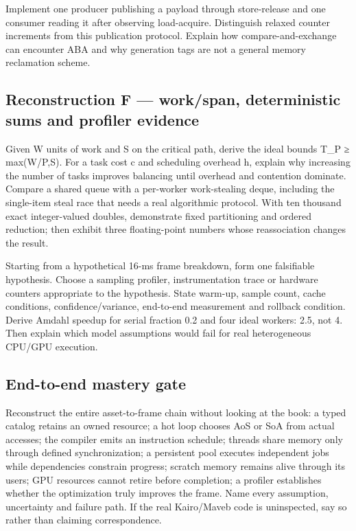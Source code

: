 Implement one producer publishing a payload through store-release and one consumer reading it after observing load-acquire. Distinguish relaxed counter increments from this publication protocol. Explain how compare-and-exchange can encounter ABA and why generation tags are not a general memory reclamation scheme.

\subsection{Reconstruction F --- work/span, deterministic sums and profiler evidence}\label{appendix-2587680a4fe3-reconstruction-f-workspan-deterministic-sums-and-profiler-evidence}

\hypertarget{appendix-2587680a4fe3-reconstruction-f-workspan-deterministic-sums-and-profiler-evidence}{}

Given W units of work and S on the critical path, derive the ideal bounds T\_P ≥ max(W/P,S). For a task cost c and scheduling overhead h, explain why increasing the number of tasks improves balancing until overhead and contention dominate. Compare a shared queue with a per-worker work-stealing deque, including the single-item steal race that needs a real algorithmic protocol. With ten thousand exact integer-valued doubles, demonstrate fixed partitioning and ordered reduction; then exhibit three floating-point numbers whose reassociation changes the result.

Starting from a hypothetical 16-ms frame breakdown, form one falsifiable hypothesis. Choose a sampling profiler, instrumentation trace or hardware counters appropriate to the hypothesis. State warm-up, sample count, cache conditions, confidence/variance, end-to-end measurement and rollback condition. Derive Amdahl speedup for serial fraction 0.2 and four ideal workers: 2.5, not 4. Then explain which model assumptions would fail for real heterogeneous CPU/GPU execution.

\subsection{End-to-end mastery gate}\label{appendix-2587680a4fe3-end-to-end-mastery-gate}

\hypertarget{appendix-2587680a4fe3-end-to-end-mastery-gate}{}

Reconstruct the entire asset-to-frame chain without looking at the book: a typed catalog retains an owned resource; a hot loop chooses AoS or SoA from actual accesses; the compiler emits an instruction schedule; threads share memory only through defined synchronization; a persistent pool executes independent jobs while dependencies constrain progress; scratch memory remains alive through its users; GPU resources cannot retire before completion; a profiler establishes whether the optimization truly improves the frame. Name every assumption, uncertainty and failure path. If the real Kairo/Maveb code is uninspected, say so rather than claiming correspondence.

